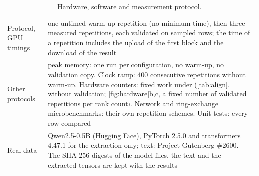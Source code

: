 \begin{table}[!ht]
\begin{tabularx}{\textwidth}{@{}l Y@{}}
Protocol, GPU timings & one untimed warm-up repetition (no minimum time), then three measured repetitions, each validated on sampled rows; the time of a repetition includes the upload of the first block and the download of the result\\
Other protocols & peak memory: one run per configuration, no warm-up, no validation copy. Clock ramp: 400 consecutive repetitions without warm-up. Hardware counters: fixed work under  (\cref{tab:align}, without validation; \cref{fig:hardware}b,c, a fixed number of validated repetitions per rank count). Network and ring-exchange microbenchmarks: their own repetition schemes. Unit tests: every row compared\\
Real data & Qwen2.5-0.5B (Hugging Face), PyTorch 2.5.0 and transformers 4.47.1 for the extraction only; text: Project Gutenberg \#2600. The SHA-256 digests of the model files, the text and the extracted tensors are kept with the results\\
\bottomrule
\end{tabularx}
\caption{Hardware, software and measurement protocol.}
\label{tab:environment}
\end{table}

